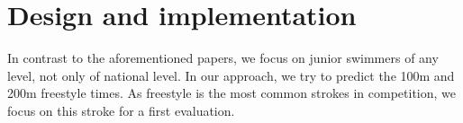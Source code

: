 \section{Design and implementation}\label{sec:contribution}
 In contrast to the aforementioned papers, we focus on junior swimmers of any level, not only of national level. In our approach, we try to predict the 100m and 200m freestyle times. As freestyle is the most common strokes in competition, we focus on this stroke for a first evaluation.
